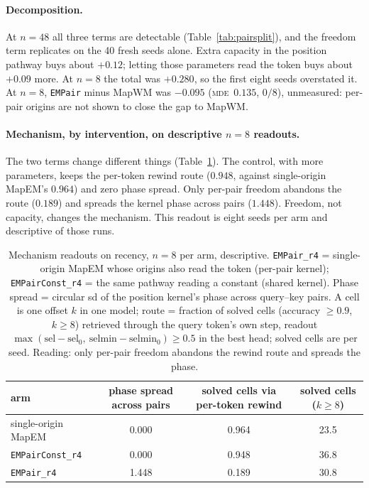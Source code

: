 \documentclass[10pt]{article}
\newcommand{\mde}{\textsc{mde}}
\newcommand{\arm}[1]{\texttt{#1}}
\begin{document}
\paragraph{Decomposition.} At $n=48$ all three terms are detectable (Table~\ref{tab:pairsplit}), and the
freedom term replicates on the 40 fresh seeds alone. Extra capacity in the position pathway buys about
$+0.12$; letting those parameters read the token buys about $+0.09$ more. At $n=8$ the total was $+0.280$,
so the first eight seeds overstated it. At $n=8$, \arm{EMPair} minus MapWM was $-0.095$ (\mde\ $0.135$,
$0/8$), unmeasured: per-pair origins are not shown to close the gap to MapWM.

\paragraph{Mechanism, by intervention, on descriptive $n=8$ readouts.} The two terms change different things
(Table~\ref{tab:pair-mech}). The control, with more parameters, keeps the per-token rewind route
($0.948$, against single-origin MapEM's $0.964$) and zero phase spread. Only per-pair freedom abandons
the route ($0.189$) and spreads the kernel phase across pairs ($1.448$). Freedom, not capacity, changes the
mechanism. This readout is eight seeds per arm and descriptive of those runs. %

\begin{table}[t]
\centering
\small
\captionsetup{font=footnotesize,skip=4pt}
\caption{Mechanism readouts on recency, $n=8$ per arm, descriptive. \arm{EMPair\_r4} = single-origin MapEM whose origins also read the token (per-pair kernel); \arm{EMPairConst\_r4} = the same pathway reading a constant (shared kernel). Phase spread = circular sd of the position kernel's phase across query--key pairs. A cell is one offset $k$ in one model; route = fraction of solved cells (accuracy $\ge0.9$, $k\ge8$) retrieved through the query token's own step, readout $\max(\mathrm{sel}-\mathrm{sel}_0,\ \mathrm{selmin}-\mathrm{selmin}_0)\ge0.5$ in the best head; solved cells are per seed. Reading: only per-pair freedom abandons the rewind route and spreads the phase.}
\label{tab:pair-mech}
\begin{tabular}{@{}lccc@{}}
\toprule
arm & phase spread across pairs & solved cells via per-token rewind & solved cells ($k\ge8$) \\
\midrule
single-origin MapEM   & 0.000 & 0.964 & 23.5 \\
\arm{EMPairConst\_r4} & 0.000 & 0.948 & 36.8 \\
\arm{EMPair\_r4}      & 1.448 & 0.189 & 30.8 \\
\bottomrule
\end{tabular}
\end{table}
\end{document}

